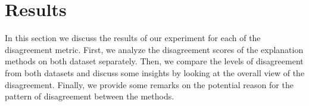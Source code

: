 \section{Results}
\label{sec:result}

In this section we discuss the results of our experiment for each of the disagreement metric. First, we analyze the disagreement scores of the explanation methods on both dataset separately. Then, we compare the levels of disagreement from both datasets and discuss some insights by looking at the overall view of the disagreement. Finally, we provide some remarks on the potential reason for the pattern of disagreement between the methods.



